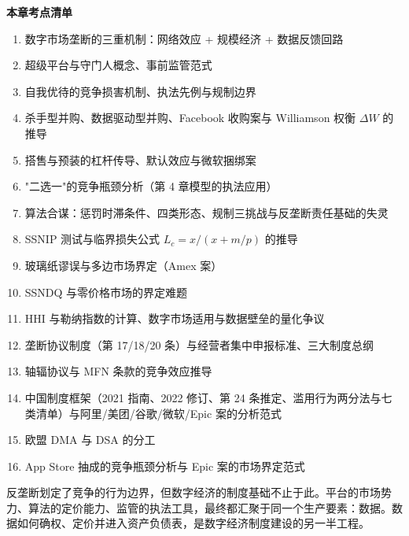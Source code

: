 \begin{chapterbox}
\textbf{本章考点清单}

\begin{enumerate}
\item 数字市场垄断的三重机制：网络效应 + 规模经济 + 数据反馈回路 
\item 超级平台与守门人概念、事前监管范式 
\item 自我优待的竞争损害机制、执法先例与规制边界 
\item 杀手型并购、数据驱动型并购、Facebook 收购案与 Williamson 权衡 $\Delta W$ 的推导 
\item 搭售与预装的杠杆传导、默认效应与微软捆绑案 
\item "二选一"的竞争瓶颈分析（第 4 章模型的执法应用）
\item 算法合谋：惩罚时滞条件、四类形态、规制三挑战与反垄断责任基础的失灵 
\item SSNIP 测试与临界损失公式 $L_c = x/(x + m/p)$ 的推导 
\item 玻璃纸谬误与多边市场界定（Amex 案）
\item SSNDQ 与零价格市场的界定难题 
\item HHI 与勒纳指数的计算、数字市场适用与数据壁垒的量化争议 
\item 垄断协议制度（第 17/18/20 条）与经营者集中申报标准、三大制度总纲 
\item 轴辐协议与 MFN 条款的竞争效应推导 
\item 中国制度框架（2021 指南、2022 修订、第 24 条推定、滥用行为两分法与七类清单）与阿里/美团/谷歌/微软/Epic 案的分析范式 
\item 欧盟 DMA 与 DSA 的分工 
\item App Store 抽成的竞争瓶颈分析与 Epic 案的市场界定范式 
\end{enumerate}
\end{chapterbox}

反垄断划定了竞争的行为边界，但数字经济的制度基础不止于此。平台的市场势力、算法的定价能力、监管的执法工具，最终都汇聚于同一个生产要素：数据。数据如何确权、定价并进入资产负债表，是数字经济制度建设的另一半工程。
